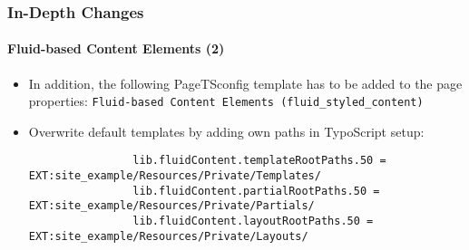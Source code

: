 \begin{frame}[fragile]
	\frametitle{In-Depth Changes}
	\framesubtitle{Fluid-based Content Elements (2)}

	\lstset{basicstyle=\tiny\ttfamily}

	\begin{itemize}

		\item In addition, the following PageTSconfig template has to be added to the page properties:\newline
			\small
				\texttt{Fluid-based Content Elements (fluid\_styled\_content)}
			\normalsize

		\item Overwrite default templates by adding own paths in TypoScript setup:

			\begin{lstlisting}
				lib.fluidContent.templateRootPaths.50 = EXT:site_example/Resources/Private/Templates/
				lib.fluidContent.partialRootPaths.50 = EXT:site_example/Resources/Private/Partials/
				lib.fluidContent.layoutRootPaths.50 = EXT:site_example/Resources/Private/Layouts/
			\end{lstlisting}

	\end{itemize}

\end{frame}



